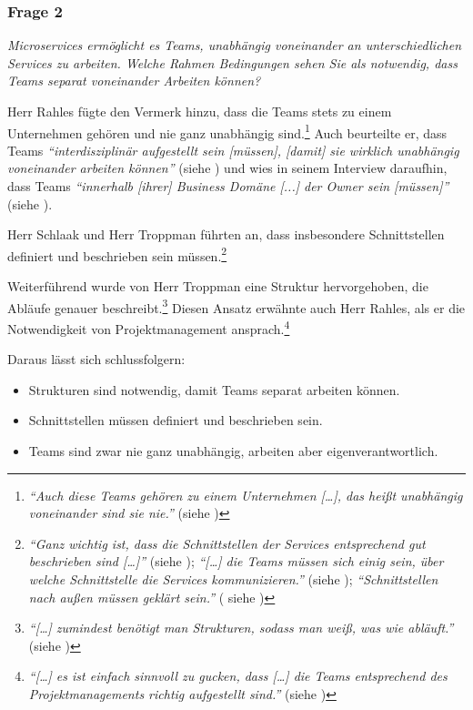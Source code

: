 \subsubsection{Frage 2}
\label{sec:frage2}

\textit{Microservices ermöglicht es Teams, unabhängig voneinander an unterschiedlichen Services zu arbeiten. Welche Rahmen Bedingungen sehen Sie als notwendig, dass Teams separat voneinander Arbeiten können?}

Herr Rahles fügte den Vermerk hinzu, dass die Teams stets zu einem Unternehmen gehören und nie ganz unabhängig sind.\footnote{
\textit{\enquote{Auch diese Teams gehören zu einem Unternehmen […], das heißt unabhängig voneinander sind sie nie.}} (siehe )
}
Auch beurteilte er, dass Teams \textit{\enquote{interdisziplinär aufgestellt sein [müssen], [damit] sie wirklich unabhängig voneinander arbeiten können}} (siehe ) und wies in seinem Interview daraufhin, dass Teams \textit{\enquote{innerhalb [ihrer] Business Domäne [...] der Owner sein [müssen]}} (siehe ).

Herr Schlaak und Herr Troppman führten an, dass insbesondere Schnittstellen definiert und beschrieben sein müssen.\footnote{
\textit{\enquote{Ganz wichtig ist, dass die Schnittstellen der Services entsprechend gut beschrieben sind […]}} (siehe ); \textit{\enquote{[…] die Teams müssen sich einig sein, über welche Schnittstelle die Services kommunizieren.}} (siehe ); \textit{\enquote{Schnittstellen nach außen müssen geklärt sein.}} ( siehe )
}

Weiterführend wurde von Herr Troppman eine Struktur hervorgehoben, die Abläufe genauer beschreibt.\footnote{
\textit{\enquote{[…] zumindest benötigt man Strukturen, sodass man weiß, was wie abläuft.}} (siehe )
} Diesen Ansatz erwähnte auch Herr Rahles, als er die Notwendigkeit von Projektmanagement ansprach.\footnote{
\textit{\enquote{[…] es ist einfach sinnvoll zu gucken, dass […] die Teams entsprechend des Projektmanagements richtig aufgestellt sind.}} (siehe )
}

\label{sec:eigenverantwortlich} \label{sec:schnittstelle}
Daraus lässt sich schlussfolgern:
\begin{itemize}
	\item  Strukturen sind notwendig, damit Teams separat arbeiten können.
	\item Schnittstellen müssen definiert und beschrieben sein.
	\item Teams sind zwar nie ganz unabhängig, arbeiten aber eigenverantwortlich.
\end{itemize}

